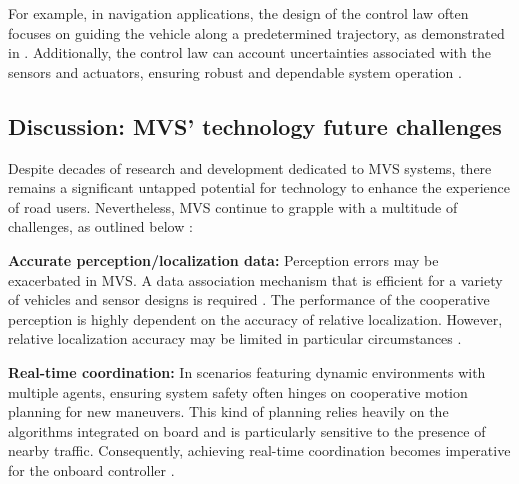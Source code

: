    For example, in navigation applications, the design of the control law often focuses on guiding the vehicle along a predetermined trajectory, as demonstrated in \cite{vilca2015novel}\cite{chebly2019coupled}. Additionally, the control law can account uncertainties associated with the sensors and actuators, ensuring robust and dependable system operation \cite{yang2021comparative}.
    
   





















\subsection*{Discussion: MVS' technology future challenges}

Despite decades of research and development dedicated to MVS systems, there remains a significant untapped potential for technology to enhance the experience of road users. Nevertheless, MVS continue to grapple with a multitude of challenges, as outlined below \cite{eskandarian2019research}\cite{guanetti2018control}\cite{malik2021collaborative}\cite{ventura2015safe}: 

\textbf{Accurate perception/localization data:} Perception errors may be exacerbated in MVS. A data association mechanism that is efficient for a variety of vehicles and sensor designs is required \cite{kim2015impact}. The performance of the cooperative perception is highly dependent on the accuracy of relative localization. However, relative localization accuracy may be limited in particular circumstances \cite{luft2016recursive}. 

\textbf{Real-time coordination:} In scenarios featuring dynamic environments with multiple agents, ensuring system safety often hinges on cooperative motion planning for new maneuvers. This kind of planning relies heavily on the algorithms integrated on board and is particularly sensitive to the presence of nearby traffic. Consequently, achieving real-time coordination becomes imperative for the onboard controller \cite{ding2019rule}\cite{qu2009cooperative}. 

